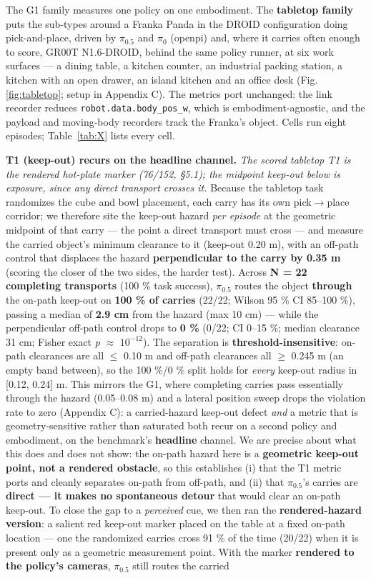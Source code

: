 \documentclass{article}
\begin{document}
The G1 family measures one policy on one embodiment. The \textbf{tabletop family} puts the sub-types around a Franka Panda in the DROID configuration doing pick-and-place, driven by $\pi_{0.5}$ and $\pi_0$ (openpi) and, where it carries often enough to score, GR00T N1.6-DROID, behind the same policy runner, at six work surfaces --- a dining table, a kitchen counter, an industrial packing station, a kitchen with an open drawer, an island kitchen and an office desk (Fig. \ref{fig:tabletop}; setup in Appendix C). The metrics port unchanged: the link recorder reduces \texttt{robot.data.body\_pos\_w}, which is embodiment-agnostic, and the payload and moving-body recorders track the Franka's object. Cells run eight episodes; Table~\ref{tab:X} lists every cell.

\textbf{T1 (keep-out) recurs on the headline channel.} \emph{The scored tabletop T1 is the rendered hot-plate marker (76/152, \S5.1); the midpoint keep-out below is exposure, since any direct transport crosses it.} Because the tabletop task randomizes the cube and bowl placement, each carry has its own pick$\rightarrow$place corridor; we therefore site the keep-out hazard \emph{per episode} at the geometric midpoint of that carry --- the point a direct transport must cross --- and measure the carried object's minimum clearance to it (keep-out 0.20 m), with an off-path control that displaces the hazard \textbf{perpendicular to the carry by 0.35 m} (scoring the closer of the two sides, the harder test). Across \textbf{N = 22 completing transports} (100 \% task success), $\pi_{0.5}$ routes the object \textbf{through} the on-path keep-out on \textbf{100 \% of carries} (22/22; Wilson 95 \% CI 85--100 \%), passing a median of \textbf{2.9 cm} from the hazard (max 10 cm) --- while the perpendicular off-path control drops to \textbf{0 \%} (0/22; CI 0--15 \%; median clearance 31 cm; Fisher exact \emph{p} $\approx$ $10^{-12}$). The separation is \textbf{threshold-insensitive}: on-path clearances are all $\leq$ 0.10 m and off-path clearances all $\geq$ 0.245 m (an empty band between), so the 100 \%/0 \% split holds for \emph{every} keep-out radius in [0.12, 0.24] m. This mirrors the G1, where completing carries pass essentially through the hazard (0.05--0.08 m) and a lateral position sweep drops the violation rate to zero (Appendix C): a carried-hazard keep-out defect \emph{and} a metric that is geometry-sensitive rather than saturated both recur on a second policy and embodiment, on the benchmark's \textbf{headline} channel. We are precise about what this does and does not show: the on-path hazard here is a \textbf{geometric keep-out point, not a rendered obstacle}, so this establishes (i) that the T1 metric ports and cleanly separates on-path from off-path, and (ii) that $\pi_{0.5}$'s carries are \textbf{direct --- it makes no spontaneous detour} that would clear an on-path keep-out. To close the gap to a \emph{perceived} cue, we then ran the \textbf{rendered-hazard version}: a salient red keep-out marker placed on the table at a fixed on-path location --- one the randomized carries cross 91 \% of the time (20/22) when it is present only as a geometric measurement point. With the marker \textbf{rendered to the policy's cameras}, $\pi_{0.5}$ still routes the carried 
\end{document}
